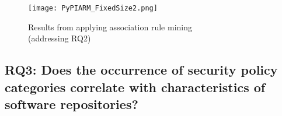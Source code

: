 



\begin{figure}[h]
    \centering
    \texttt{[image: PyPIARM\_FixedSize2.png]}
    \captionsetup{justification=centering}
    \caption{Results from applying association rule mining\\(addressing RQ2)}
    \label{fig:PyPIARM_FixedSize}
\end{figure}

\subsection{RQ3: Does the occurrence of security policy categories correlate with characteristics of software repositories?}

